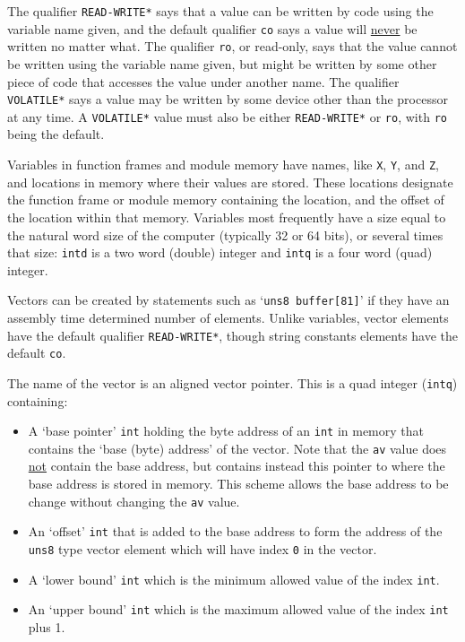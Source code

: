 \documentclass[12pt]{article}
\begin{document}
The qualifier {\tt *READ-WRITE*} says that a value can be written by code
using the variable name given,
and the default qualifier {\tt co}
says a value will \underline{never} be written
no matter what.
The qualifier {\tt ro}, or read-only, says that
the value cannot be written using the variable name given, but might be
written by some other piece of code that accesses the value under another
name.
The qualifier {\tt *VOLATILE*} says a value may be
written by some device other than the processor at any time.
A {\tt *VOLATILE*} value must also be either {\tt *READ-WRITE*}
or {\tt ro}, with {\tt ro} being the default.

Variables in function frames and module memory
have names, like {\tt X}, {\tt Y}, and {\tt Z},
and locations in memory where their values are stored.
These locations designate the
function frame or module memory containing the location,
and the offset of the location within that memory.
Variables most frequently
have a size equal to the natural
word size of the computer (typically 32 or 64 bits), or
several times that size: {\tt intd} is a two word (double) integer
and {\tt intq} is a four word (quad) integer.

Vectors can be created by statements such as `{\tt uns8 buffer[81]}'
if they have an assembly time determined number of elements.
Unlike variables, vector elements have the default qualifier
{\tt *READ-WRITE*}, though string constants elements have the
default {\tt co}.

The name of the vector is an aligned vector pointer.  This is a
quad integer ({\tt intq}) containing:
\begin{itemize}
\item A `base pointer' {\tt int} holding the byte address
of an {\tt int} in memory
that contains the `base (byte) address' of the vector.
Note that the {\tt av} value does \underline{not} contain
the base address, but contains instead this pointer to where
the base address is stored in memory.  This scheme allows
the base address to be change without changing the {\tt av} value.
\item An `offset' {\tt int} that is added to the base address
to form the address of the {\tt uns8} type vector element
which will have index {\tt 0} in the vector.
\item A `lower bound' {\tt int} which is the minimum allowed
value of the index {\tt int}.
\item An `upper bound' {\tt int} which is the maximum allowed
value of the index {\tt int} plus 1.
\end{itemize}
\end{document}

